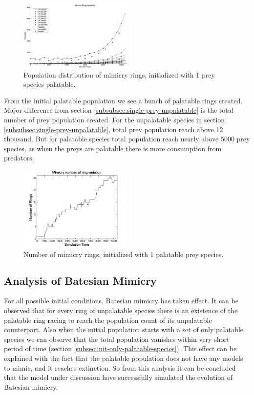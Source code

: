 \documentclass[letterpaper]{article}
\numberwithin{equation}{section}
\begin{document}
\begin{figure}[H]
	\centering
	\includegraphics[width=0.5\textwidth]{../tex/images/simTime10k-1Prey-p}
	\caption[Population distribution of mimicry rings (1 prey species palatable)]{Population distribution of mimicry rings, initialized with 1 prey species palatable.}
	\label{fig:plot-1-prey-p}
\end{figure}

From the initial palatable population we see a bunch of palatable rings created. Major difference from section \ref{subsubsec:single-prey-unpalatable} is the total number of prey population created. For the unpalatable species in section \ref{subsubsec:single-prey-unpalatable}, total prey population reach above 12 thousand. But for palatable species total population reach nearly above 5000 prey species, as when the preys are palatable there is more consumption from predators. 

\begin{figure}[H]
	\centering
	\includegraphics[width=0.5\textwidth]{../tex/images/ringSize10k-1Prey-p}
	\caption[Number of mimicry rings (1 palatable prey species)]{Number of mimicry rings, initialized with 1 palatable prey species.}
	\label{fig:ringSize8k-1-Prey-p}
\end{figure}

\subsection{Analysis of Batesian Mimicry}
\label{subsec:result-batesian-mimicry}
For all possible initial conditions, Batesian mimicry has taken effect. It can be observed that for every ring of unpalatable species there is an existence of the palatable ring racing to reach the population count of its unpalatable counterpart. Also when the initial population starts with a set of only palatable species we can observe that the total population vanishes within very short period of time (section \ref{subsec:init-only-palatable-species}). This effect can be explained with the fact that the palatable population does not have any models to mimic, and it reaches extinction. So from this analysis it can be concluded that the model under discussion have successfully simulated the evolution of Batesian mimicry.
\end{document}
